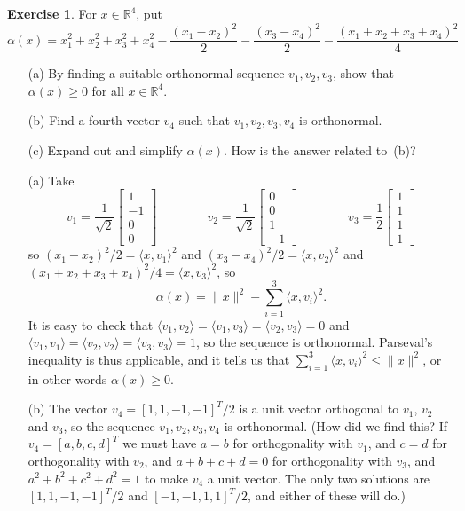 \documentclass{amsart}
\newcommand{\R}         {{\mathbb{R}}}
\newcommand{\bsm}       {\left[\begin{smallmatrix}}
\newcommand{\esm}       {\end{smallmatrix}\right]}
\newcommand{\al}        {\alpha}
\newcommand{\ip}[1]     {\langle #1\rangle}
\renewcommand{\:}       {\colon}
\theoremstyle{definition}
\newtheorem{exercise}{Exercise}[section]
\renewenvironment{solution}{\SolutionAtEnd}{\endSolutionAtEnd}
\begin{document}
\begin{exercise}\label{ex-ip-misc-i}
 For $x\in\R^4$, put 
 \[ \al(x) = x_1^2+x_2^2+x_3^2+x_4^2 -
      \frac{(x_1-x_2)^2}{2} -
      \frac{(x_3-x_4)^2}{2} - 
      \frac{(x_1+x_2+x_3+x_4)^2}{4}
 \] 
 \begin{itemize}
  \item[(a)] By finding a suitable orthonormal sequence $v_1,v_2,v_3$,
   show that $\al(x)\geq 0$ for all $x\in\R^4$.
  \item[(b)] Find a fourth vector $v_4$ such that $v_1,v_2,v_3,v_4$ is
   orthonormal.
  \item[(c)] Expand out and simplify $\al(x)$.  How is the answer related to~(b)? 
 \end{itemize}
\end{exercise}
\begin{solution}
 \begin{itemize}
  \item[(a)] Take
   \[ v_1 = \frac{1}{\sqrt{2}}\bsm 1 \\ -1\\ 0 \\ 0 \esm \hspace{4em} 
      v_2 = \frac{1}{\sqrt{2}}\bsm 0 \\ 0\\ 1 \\ -1 \esm \hspace{4em} 
      v_3 = \frac{1}{2} \bsm 1\\ 1\\ 1\\ 1 \esm
   \] 
   so $(x_1-x_2)^2/2=\ip{x,v_1}^2$ and $(x_3-x_4)^2/2=\ip{x,v_2}^2$
   and $(x_1+x_2+x_3+x_4)^2/4=\ip{x,v_3}^2$, so 
   \[ \al(x) = \|x\|^2 - \sum_{i=1}^3 \ip{x,v_i}^2. \]
   It is easy to check that $\ip{v_1,v_2}=\ip{v_1,v_3}=\ip{v_2,v_3}=0$
   and $\ip{v_1,v_1}=\ip{v_2,v_2}=\ip{v_3,v_3}=1$, so the sequence is
   orthonormal.  Parseval's inequality is thus applicable, and it
   tells us that $\sum_{i=1}^3\ip{x,v_i}^2\leq\|x\|^2$, or in other
   words $\al(x)\geq 0$.
  \item[(b)] The vector $v_4=[1,1,-1,-1]^T/2$ is a unit vector
   orthogonal to $v_1$, $v_2$ and $v_3$, so the sequence
   $v_1,v_2,v_3,v_4$ is orthonormal.  (How did we find this?  If
   $v_4=[a,b,c,d]^T$ we must have $a=b$ for orthogonality with $v_1$,
   and $c=d$ for orthogonality with $v_2$, and $a+b+c+d=0$ for
   orthogonality with $v_3$, and $a^2+b^2+c^2+d^2=1$ to make $v_4$ a
   unit vector.  The only two solutions are $[1,1,-1,-1]^T/2$ and
   $[-1,-1,1,1]^T/2$, and either of these will do.)

\end{itemize}
\end{solution}
\end{document}
